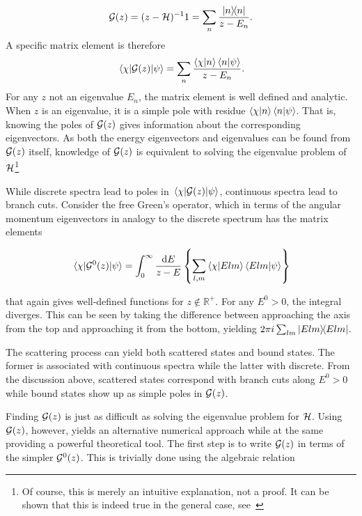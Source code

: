\begin{equation*}
  \mathcal{G}(z) = (z-\mathcal{H})^{-1}1 = \sum_{n}\frac{\op{n}}{z-E_{n}}.
\end{equation*}
A specific matrix element is therefore
\begin{equation*}
  \mel{\chi}{\oop{G}(z)}{\psi} =\sum_{n} \frac{\ip{\chi}{n}\ip{n}{\psi}}{z-E_{n}}.
\end{equation*}
\newcommand{\gop}{\oop{G}(z)}
\newcommand{\mgop}{\(\oop{G}(z)\)}
For any \(z\) not an eigenvalue \(E_{n}\), the matrix element is well defined and
analytic. When \(z\) is an eigenvalue, it is a simple pole with residue
\(\ip{\chi}{n}\ip{n}{\psi}\). That is, knowing the poles of \(\mathcal{G}(z)\) gives
information about the corresponding eigenvectors. As both the energy
eigenvectors and eigenvalues can be found from \mgop{} itself, knowledge of
\mgop{} is equivalent to solving the eigenvalue problem of
\(\mathcal{H}\)\footnote{Of course, this is merely an intuitive explanation, not a
  proof. It can be shown that this is indeed true in the general case, see~\cite[p.~131]{taylor}}

While discrete spectra lead to poles in \(\mel{\chi}{\gop{}}{\psi}\), continuous spectra lead to 
branch cuts. Consider the free Green's operator, which in terms of the angular
momentum eigenvectors in analogy to the discrete spectrum has the matrix elements

\begin{equation*}
  \mel{\chi}{\oop{G}^{0}(z)}{\psi} = \int_{0}^{\infty}\frac{\dd E}{z-E}\left\{
  \sum_{l,m}\ip{\chi}{Elm}\ip{Elm}{\psi}
  \right\}
\end{equation*}

that again gives well-defined functions for \(z\notin\mathbb{R}^{+}\). For any
\(E^{0} > 0\), the integral diverges. This can be seen by taking the difference
between approaching the axis from the top and approaching it from the bottom,
yielding\cite[p.~469]{messiah} \(2\pi i \sum_{lm}\op{Elm}\).

The scattering process can yield both scattered states and bound states. The
former is associated with continuous spectra while the latter with discrete.
From the discussion above, scattered states correspond with branch cuts
along \(E^{0}>0\) while bound states show up as simple poles in \(\mathcal{G}(z)\).

Finding \(\mathcal{G}(z)\) is just as difficult as solving the eigenvalue problem
for \(\mathcal{H}\). Using \(\mathcal{G}(z)\), however, yields an alternative numerical
approach while at the same providing a powerful theoretical tool. The first step
is to write \(\mathcal{G}(z)\) in terms of the simpler \(\mathcal{G}^{0}(z)\). This is
trivially done using the algebraic relation

